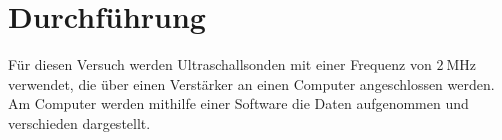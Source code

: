 \section{Durchführung}
\label{sec:Durchführung}
Für diesen Versuch werden Ultraschallsonden mit einer Frequenz von $\qty{2}{\mega\hertz}$ verwendet, die über einen Verstärker an einen Computer
angeschlossen werden. Am Computer werden mithilfe einer Software die Daten aufgenommen und verschieden dargestellt.